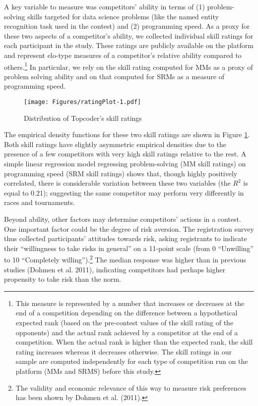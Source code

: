 \documentclass[11pt, titlepage]{article}
\begin{document}
A key variable to measure was competitors' ability in terms of (1)
problem-solving skills targeted for data science problems (like the
named entity recognition task used in the contest) and (2) programming
speed. As a proxy for these two aspects of a competitor's ability, we
collected individual skill ratings for each participant in the study.
These ratings are publicly available on the platform and represent
elo-type measures of a competitor's relative ability compared to
others.\footnote{This measure is represented by a number that increases
  or decreases at the end of a competition depending on the difference
  between a hypothetical expected rank (based on the pre-contest values
  of the skill rating of the opponents) and the actual rank achieved by
  a competitor at the end of a competition. When the actual rank is
  higher than the expected rank, the skill rating increases whereas it
  decreases otherwise. The skill ratings in our sample are computed
  independently for each type of competition run on the platform (MMs
  and SRMS) before this study.} In particular, we rely on the skill
rating computed for MMs as a proxy of problem solving ability and on
that computed for SRMs as a measure of programming speed.

\begin{figure}
\centering
\caption{Distribution of Topcoder's skill ratings}
\label{skill ratings}
\texttt{[image: Figures/ratingPlot-1.pdf]}
\end{figure}

The empirical density functions for these two skill ratings are shown in
Figure \ref{skill ratings}. Both skill ratings have slightly asymmetric
empirical densities due to the presence of a few competitors with very
high skill ratings relative to the rest. A simple linear regression
model regressing problem-solving (MM skill ratings) on programming speed
(SRM skill ratings) shows that, though highly positively correlated,
there is considerable variation between these two variables (the \(R^2\)
is equal to 0.21); suggesting the same competitor may perform very
differently in races and tournaments.

Beyond ability, other factors may determine competitors' actions in a
contest. One important factor could be the degree of risk aversion. The
registration survey thus collected participants' attitudes towards risk,
asking registrants to indicate their ``willingness to take risks in
general'' on a 11-point scale (from 0 ``Unwilling'' to 10 ``Completely
willing'').\footnote{The validity and economic relevance of this way to
  measure risk preferences has been shown by Dohmen et al. (2011).} The
median response was higher than in previous studies (Dohmen et al.
2011), indicating competitors had perhaps higher propensity to take risk
than the norm.
\end{document}
